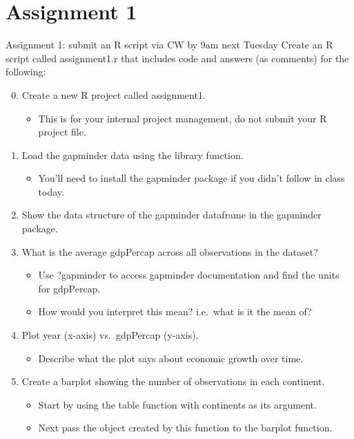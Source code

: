 \documentclass[
  8pt,
  ignorenonframetext,
  dvipsnames]{beamer}
\providecommand{\tightlist}{%
  \setlength{\itemsep}{0pt}\setlength{\parskip}{0pt}}
\let\olditem\item
\renewcommand{\item}{%
  \olditem\vspace{4pt}
}
\begin{document}
\hypertarget{assignment-1}{%
\section{Assignment 1}\label{assignment-1}}

\begin{frame}{Assignment 1: submit an R script via CW by 9am next
Tuesday}
\protect\hypertarget{assignment-1-submit-an-r-script-via-cw-by-9am-next-tuesday}{}
Create an R script called assignment1.r that includes code and answers
(as comments) for the following:

\begin{enumerate}
\setcounter{enumi}{-1}
\tightlist
\item
  Create a new R project called assignment1.

  \begin{itemize}
  \tightlist
  \item
    This is for your internal project management, do not submit your R
    project file.
  \end{itemize}
\item
  Load the gapminder data using the library function.

  \begin{itemize}
  \tightlist
  \item
    You'll need to install the gapminder package if you didn't follow in
    class today.
  \end{itemize}
\item
  Show the data structure of the gapminder dataframe in the gapminder
  package.
\item
  What is the average gdpPercap across all observations in the dataset?

  \begin{itemize}
  \tightlist
  \item
    Use ?gapminder to access gapminder documentation and find the units
    for gdpPercap.
  \item
    How would you interpret this mean? i.e.~what is it the mean of?
  \end{itemize}
\item
  Plot year (x-axis) vs.~gdpPercap (y-axis).

  \begin{itemize}
  \tightlist
  \item
    Describe what the plot says about economic growth over time.
  \end{itemize}
\item
  Create a barplot showing the number of observations in each continent.

  \begin{itemize}
  \tightlist
  \item
    Start by using the table function with continents as its argument.
  \item
    Next pass the object created by this function to the barplot
    function.
  \end{itemize}
\end{enumerate}
\end{frame}
\end{document}
